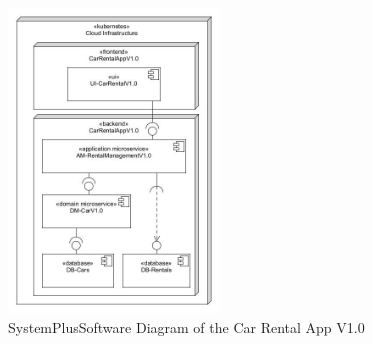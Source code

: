 \begin{figure}
    \centering
    \includegraphics[width=0.5\textwidth]{figures/microservices/introduction/ms_dmCar_SPScarRental.png}
    \caption{SystemPlusSoftware Diagram of the Car Rental App V1.0}
    \label{fig:system_plus_software_car_rental_app_v1}
\end{figure}
